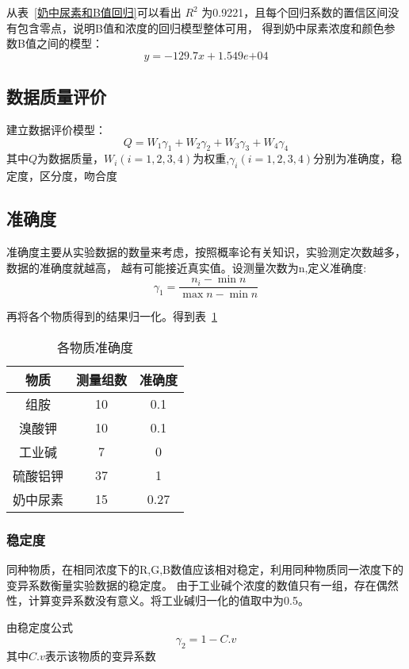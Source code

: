     从表~\ref{奶中尿素和B值回归}可以看出 $R^2$ 为0.9221，且每个回归系数的置信区间没有包含零点，说明B值和浓度的回归模型整体可用，
    得到奶中尿素浓度和颜色参数B值之间的模型：
    $$ y = -129.7x + 1.549e{+04}$$
    
    \subsection{数据质量评价}
    建立数据评价模型：
    $$Q=W_1\gamma_1+W_2\gamma_2+W_3\gamma_3+W_4\gamma_4$$
    其中$Q$为数据质量，$W_i (i=1,2,3,4) $为权重,$\gamma_{i} (i=1,2,3,4)$分别为准确度，稳定度，区分度，吻合度

    \subsection{准确度}
    准确度主要从实验数据的数量来考虑，按照概率论有关知识，实验测定次数越多，数据的准确度就越高，
    越有可能接近真实值。设测量次数为n,定义准确度:
    $$\gamma_1=\frac{n_i -\min n}{\max n-\min n}$$
    
    
    再将各个物质得到的结果归一化。得到表~\ref{各物质准确度}
    
    \begin{table}[H]
      \centering
      \caption{各物质准确度}
      \label{各物质准确度}
      \begin{tabular}{@{}ccc@{}}
      \toprule
      物质 & 测量组数  & 准确度 \\ \midrule
      组胺 & 10 & 0.1   \\    \bottomrule
      溴酸钾 & 10 & 0.1  \\    \bottomrule
      工业碱 & 7 & 0     \\      \bottomrule
      硫酸铝钾 & 37 & 1   \\     \bottomrule
      奶中尿素 & 15 & 0.27 \\    \bottomrule
      \end{tabular}
    \end{table}
    
    \subsubsection{稳定度}
    同种物质，在相同浓度下的R,G,B数值应该相对稳定，利用同种物质同一浓度下的变异系数衡量实验数据的稳定度。
    由于工业碱个浓度的数值只有一组，存在偶然性，计算变异系数没有意义。将工业碱归一化的值取中为0.5。

    由稳定度公式
    $$\gamma_2=1-C.v$$
    其中$C.v$表示该物质的变异系数

